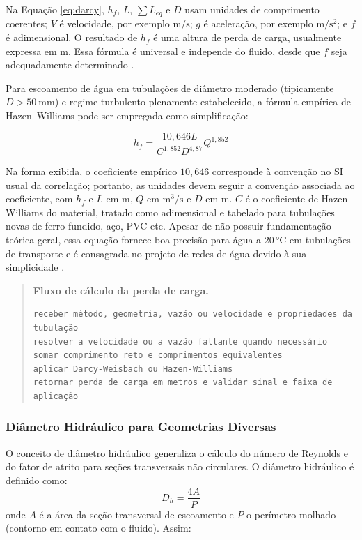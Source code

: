 Na Equação \ref{eq:darcy}, $h_f$, $L$, $\sum L_{eq}$ e $D$ usam unidades de comprimento coerentes; $V$ é velocidade, por exemplo $\mathrm{m/s}$; $g$ é aceleração, por exemplo $\mathrm{m/s^2}$; e $f$ é adimensional. O resultado de $h_f$ é uma altura de perda de carga, usualmente expressa em $\mathrm{m}$. Essa fórmula é universal e independe do fluido, desde que $f$ seja adequadamente determinado \cite{perry2007}.

Para escoamento de água em tubulações de diâmetro moderado (tipicamente $D > 50\ \mathrm{mm}$) e regime turbulento plenamente estabelecido, a fórmula empírica de Hazen--Williams pode ser empregada como simplificação:

\begin{equation}
h_{f} = \frac{10{,}646 L}{C^{1{,}852}D^{4{,}87}} Q^{1{,}852}
\label{eq:hazen}
\end{equation}

Na forma exibida, o coeficiente empírico $10{,}646$ corresponde à convenção no SI usual da correlação; portanto, as unidades devem seguir a convenção associada ao coeficiente, com $h_f$ e $L$ em $\mathrm{m}$, $Q$ em $\mathrm{m^3/s}$ e $D$ em $\mathrm{m}$. $C$ é o coeficiente de Hazen--Williams do material, tratado como adimensional e tabelado para tubulações novas de ferro fundido, aço, PVC etc. Apesar de não possuir fundamentação teórica geral, essa equação fornece boa precisão para água a 20\,°C em tubulações de transporte e é consagrada no projeto de redes de água devido à sua simplicidade \cite{perry2007,white2018}.

\begin{quote}
\small
\textbf{Fluxo de cálculo da perda de carga.}
\begin{verbatim}
receber método, geometria, vazão ou velocidade e propriedades da tubulação
resolver a velocidade ou a vazão faltante quando necessário
somar comprimento reto e comprimentos equivalentes
aplicar Darcy-Weisbach ou Hazen-Williams
retornar perda de carga em metros e validar sinal e faixa de aplicação
\end{verbatim}
\end{quote}


\subsubsection{Diâmetro Hidráulico para Geometrias Diversas}

O conceito de diâmetro hidráulico generaliza o cálculo do número de Reynolds e do fator de atrito para seções transversais não circulares. O diâmetro hidráulico é definido como:
\begin{equation}
D_{h} = \frac{4 A}{P}
\label{eq:diametro_hidraulico}
\end{equation}
onde $A$ é a área da seção transversal de escoamento e $P$ o perímetro molhado (contorno em contato com o fluido). Assim:

